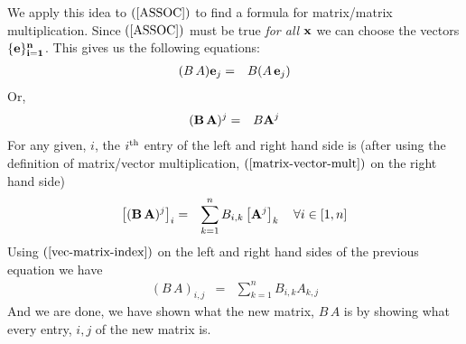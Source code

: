 \documentclass{article}
\begin{document}
We apply this idea to $(\ref{ASSOC})$ to find a formula for matrix/matrix multiplication.
Since $(\ref{ASSOC})$ must be true {\em for all\/} ${\bf x}$ we can choose the vectors $\{\bf e\}_{i=1}^n$.
This gives us the following equations:
\begin{eqnarray}
    (B \, A) {\bf e}_j & = & B (A \, {\bf e}_j) 
\end{eqnarray}
Or,
\begin{eqnarray}
	({\bf B} \, {\bf A})^j & = & B  {\bf A}^j 
\end{eqnarray}
For any given, $i$, the $i^{\rm th}$ entry of the left and right hand side is
(after using the definition of matrix/vector multiplication, $(\ref{matrix-vector-mult})$ on the right hand side)
\begin{eqnarray}
	\left[({\bf B} \, {\bf A})^j\right]_i & = & \sum_{k=1}^n B_{i,k}  \left[{\bf A}^j\right]_k  \quad \forall i \in [1, n]
\end{eqnarray}
Using $(\ref{vec-matrix-index})$ on the left and right hand sides of the previous equation we have
\begin{eqnarray}
	(B \, A)_{i, j} & = & \sum_{k=1}^n B_{i, k}  A_{k, j}  \label{matrix-matrix-mult}
\end{eqnarray}
And we are done, we have shown what the new matrix, $B \, A$ is by showing what every entry, $i, j$ of
the new matrix is.
\end{document}
